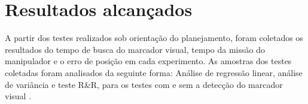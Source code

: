 \begin{table}[h!]
  \centering
  \caption{Modelo de experimentos ANOVA com detecção da \textit{tag}}
    \label{tab:tabexp3}
  \end{table}


\newpage

\section{Resultados alcançados}
\label{sec:resalcanc}
A partir dos testes realizados sob orientação do planejamento, foram coletados os resultados do tempo de busca do marcador visual, tempo da missão do manipulador e o erro de posição em cada experimento. As amostras dos testes coletadas foram analisados da seguinte forma: Análise de regressão linear, análise de variância e teste R\&R, para os testes com e sem a detecção do marcador visual . 

